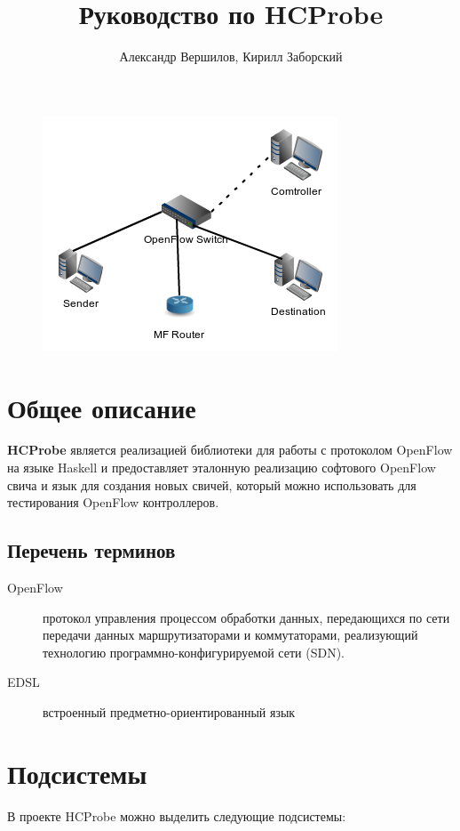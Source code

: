 \documentclass[9pt,a4paper]{article}
\title{Руководство по HCProbe}
\author{Александр Вершилов, Кирилл Заборский}
\begin{document}
\maketitle
\begin{figure}[!h]
   \centering 
   \includegraphics[width=0.3\columnwidth]{images/testcfg2.png}
\end{figure}                                                        

\tableofcontents

\pagebreak

\section{Общее описание}

\textbf{HCProbe} является реализацией библиотеки для работы с протоколом
OpenFlow на языке Haskell и предоставляет эталонную реализацию софтового
OpenFlow свича и язык для создания новых свичей, который можно использовать
для тестирования OpenFlow контроллеров.

\subsection{Перечень терминов}

\begin{description}
  \item[OpenFlow] протокол управления процессом обработки данных, передающихся
    по сети передачи данных маршрутизаторами и коммутаторами, реализующий
    технологию программно-конфигурируемой сети (SDN).
  \item[EDSL] встроенный предметно-ориентированный язык
\end{description}

\pagebreak

\section{Подсистемы}

В проекте HCProbe можно выделить следующие подсистемы:
\end{document}
